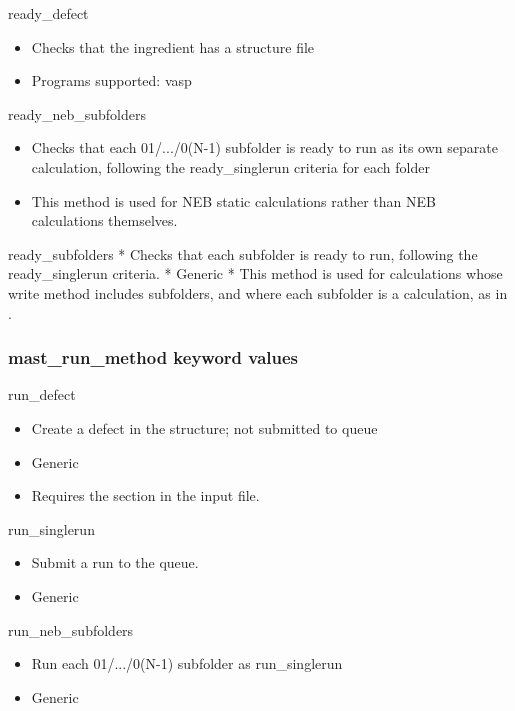 \documentclass[letterpaper,10pt,english]{sphinxmanual}
\begin{document}
ready\_defect
\begin{itemize}
\item {} 
Checks that the ingredient has a structure file

\item {} 
Programs supported: vasp

\end{itemize}

ready\_neb\_subfolders
\begin{itemize}
\item {} 
Checks that each 01/.../0(N-1) subfolder is ready to run as its own separate calculation, following the ready\_singlerun criteria for each folder

\item {} 
This method is used for NEB static calculations rather than NEB calculations themselves.

\end{itemize}

ready\_subfolders
*  Checks that each subfolder is ready to run, following the ready\_singlerun criteria.
*  Generic
*  This method is used for calculations whose write method includes subfolders, and where each subfolder is a calculation, as in .


\subsubsection{mast\_run\_method keyword values}
\label{3_0_inputfile:mast-run-method-keyword-values}
run\_defect
\begin{itemize}
\item {} 
Create a defect in the structure; not submitted to queue

\item {} 
Generic

\item {} 
Requires the  section in the input file.

\end{itemize}

run\_singlerun
\begin{itemize}
\item {} 
Submit a run to the queue.

\item {} 
Generic

\end{itemize}

run\_neb\_subfolders
\begin{itemize}
\item {} 
Run each 01/.../0(N-1) subfolder as run\_singlerun

\item {} 
Generic

\end{itemize}
\end{document}
